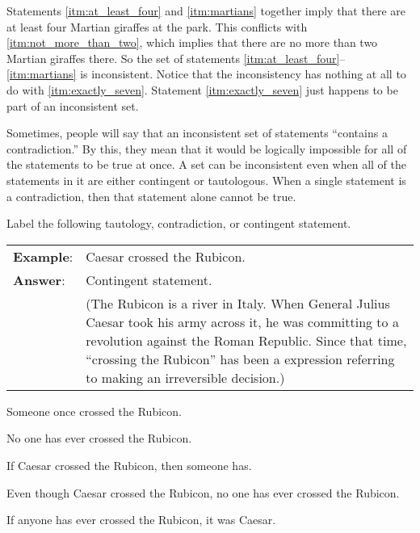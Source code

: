 Statements \ref{itm:at_least_four} and \ref{itm:martians} together imply that there are at least four Martian giraffes at the park. This conflicts with \ref{itm:not_more_than_two}, which implies that there are no more than two Martian giraffes there. So the set of statements \ref{itm:at_least_four}--\ref{itm:martians} is inconsistent. Notice that the inconsistency has nothing at all to do with \ref{itm:exactly_seven}. Statement \ref{itm:exactly_seven} just happens to be part of an inconsistent set.

Sometimes, people will say that an inconsistent set of statements ``contains a contradiction.'' By this, they mean that it would be logically impossible for all of the statements to be true at once. A set can be inconsistent even when all of the statements in it are either contingent or tautologous. When a single statement is a contradiction, then that statement alone cannot be true.



\practiceproblems
\noindent \problempart \label{pr.EnglishTautology} Label the following tautology, contradiction, or contingent statement.

\begin{longtabu}{p{.1\linewidth}p{.9\linewidth}}
\textbf{Example}: & Caesar crossed the Rubicon. \\
\textbf{Answer}: & Contingent statement. \\
&(The Rubicon is a river in Italy. When General Julius Caesar took his army across it, he was committing to a revolution against the Roman Republic. Since that time, ``crossing the Rubicon'' has been a expression referring to making an irreversible decision.)\\
\end{longtabu}

\begin{exercises}
\item Someone once crossed the Rubicon. 
\item No one has ever crossed the Rubicon. 
\item If Caesar crossed the Rubicon, then someone has. 
\item Even though Caesar crossed the Rubicon, no one has ever crossed the Rubicon. 
\item If anyone has ever crossed the Rubicon, it was Caesar. 
\end{exercises}

